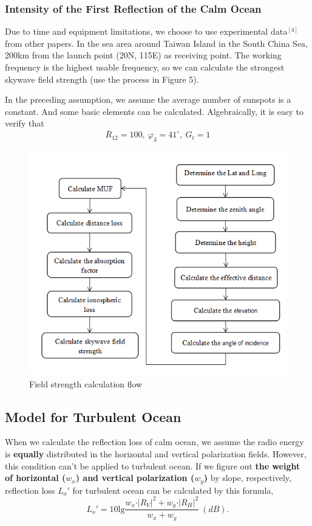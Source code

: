 \documentclass{mcmthesis}
\begin{document}
   \subsubsection{Intensity of the First Reflection of the Calm Ocean}
Due to time and equipment limitations, we choose to use experimental data$^{[4]}$ from other papers. 
In the sea area around Taiwan Island in the South China Sea, 200km from the launch point (20N, 115E) as receiving point. The working frequency is the highest usable frequency, so we can calculate the strongest skywave field strength (use the process in Figure 5). 

In the preceding assumption, we assume the average number of sunspots is a constant. And some basic elements can be calculated. 
Algebraically, it is easy to verify that
\begin{equation}
\overline{R}_{12} = 100, ~\varphi_3 = 41^\circ,~G_t=1
\end{equation}

\begin{figure}[!htbp]
    \centering
    \includegraphics[scale=0.6]{figure/process.png}
    \caption{Field strength calculation flow}
    \label{fig:myphoto55}
    \end{figure}
  
\subsection{Model for Turbulent Ocean}
When we calculate the reflection loss of calm ocean, we assume the radio energy is \textbf{equally} distributed in the horizontal and vertical polarization fields. 
However, this condition can't be applied to turbulent ocean. 
If we figure out \textbf{the weight of horizontal ($w_x$) and vertical polarization ($w_y$)} by slope, respectively, reflection loss $L_o'$ for turbulent ocean can be calculated by this formula,
\begin{equation}
L_o' = 10\mathrm{lg}\displaystyle\frac{w_x\bm\cdot|R_V|^2 + w_y\bm\cdot|R_H|^2}{w_x+w_y} ~(dB).
\end{equation}
\end{document}
